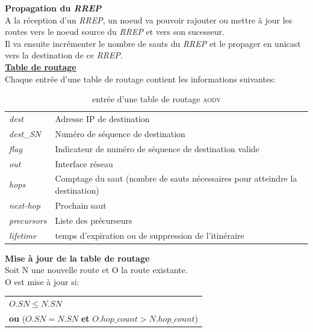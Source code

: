 \documentclass[a4paper, 12pt]{report}
\newcommand{\aodv}{\textsc{aodv}}
\begin{document}
        \textbf{Propagation du \textit{RREP}}\\
            A la réception d'un \textit{RREP}, un noeud va pouvoir rajouter ou mettre à jour
            les routes vers le noeud source du \textit{RREP} et vers son sucesseur.\\
            Il va ensuite incrémenter le nombre de sauts du \textit{RREP} et le propager en unicast vers la destination de ce \textit{RREP}.\\

        \underline{\textbf{Table de routage}}\\
        
        Chaque entrée d'une table de routage contient les informations suivantes:
        
        \begin{table}[H]
            \centering
            \begin{tabular}{|l|l|}
                \hline
                \textit{dest}       & Adresse IP de destination\\
                \textit{dest\_SN}   & Numéro de séquence de destination\\
                \textit{flag}       & Indicateur de numéro de séquence de destination valide\\
                \textit{out}        & Interface réseau\\
                \textit{hops}       & Comptage du saut (nombre de sauts nécessaires pour atteindre la destination)\\
                \textit{next-hop}   & Prochain saut\\
                \textit{precursors} & Liste des précurseurs\\
                \textit{lifetime}   & temps d'expiration ou de suppression de l'itinéraire\\
                \hline
            \end{tabular}
            \caption{entrée d'une table de routage \aodv \cite{aodv_w}}
            \label{routingTable_aodv}
        \end{table}

        \textbf{Mise à jour de la table de routage}\\
            Soit N une nouvelle route et O la route existante.\\
            O est mise à jour si:\\
            \begin{center}
                \begin{tabular}{|l|}
                    \hline
                    $O.SN \leq N.SN$ \\
                    \textbf{ou} ($O.SN = N.SN$ \textbf{et} $O.hop\_count > N.hop\_count$)\\
                    \hline
                \end{tabular}
            \end{center}
        
\end{document}
